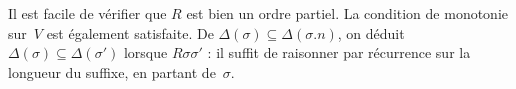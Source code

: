\documentclass[../../../include/open-logic-section]{subfiles}
\begin{document}
Il est facile de vérifier que $R$ est bien un ordre partiel. La
condition de monotonie sur~$V$ est également satisfaite. De
$\Delta(\sigma) \subseteq \Delta(\sigma.n)$, on déduit
$\Delta(\sigma) \subseteq \Delta(\sigma')$ lorsque
$R\sigma\sigma'$ : il suffit de raisonner par récurrence sur la
longueur du suffixe, en partant de~$\sigma$.
\end{document}
